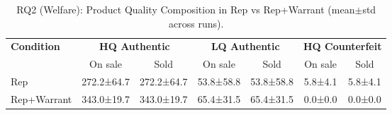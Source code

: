\begin{table}[!h]
    \centering
    \small
    \caption{RQ2 (Welfare): Product Quality Composition in Rep vs Rep+Warrant (mean$\pm$std across runs).}
    \label{tab:rq2_welfare_product_quality}
    \begin{tabular}{lcccccc}
    \toprule
    \textbf{Condition} & \multicolumn{2}{c}{\textbf{HQ Authentic}} & \multicolumn{2}{c}{\textbf{LQ Authentic}} & \multicolumn{2}{c}{\textbf{HQ Counterfeit}} \\
    \cmidrule(lr){2-3}\cmidrule(lr){4-5}\cmidrule(lr){6-7}
     & On sale & Sold & On sale & Sold & On sale & Sold \\
    \midrule
    Rep         & 272.2±64.7 & 272.2±64.7 & 53.8±58.8 & 53.8±58.8 & 5.8±4.1 & 5.8±4.1 \\
    Rep+Warrant & 343.0±19.7 & 343.0±19.7 & 65.4±31.5 & 65.4±31.5 & 0.0±0.0 & 0.0±0.0 \\
    \bottomrule
    \end{tabular}
\end{table}
